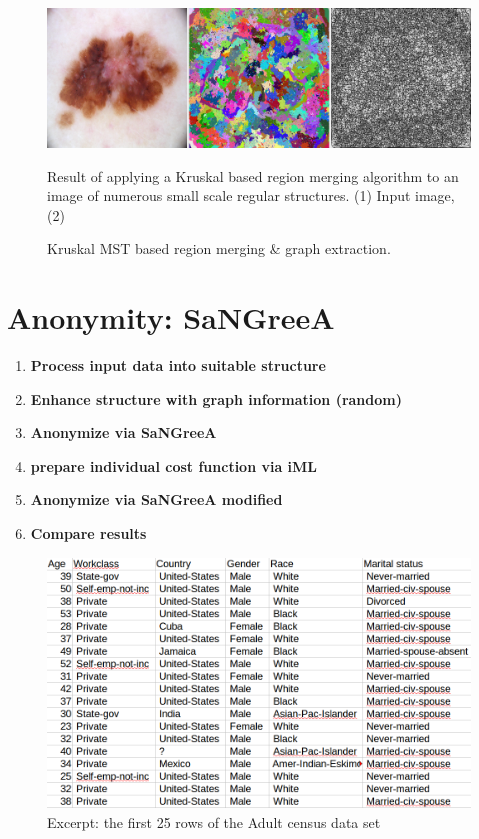 	\begin{figure}[H]
		\begin{center}
			\includegraphics [width=1\textwidth] {figures/graph_ext}
			\caption{Kruskal MST based region merging \& graph extraction.}
			\label{fig:graph_extract}
		\end{center}
		\small 
		Result of applying a Kruskal based region merging algorithm to an image of numerous small scale regular structures. (1) Input image, (2) 
		
	\end{figure}


\section{Anonymity: SaNGreeA}
\label{sect:aoa_anonymization}

	\begin{enumerate}
		\item \textbf{Process input data into suitable structure}
		\item \textbf{Enhance structure with graph information (random)}
		\item \textbf{Anonymize via SaNGreeA}
		\item \textbf{prepare individual cost function via iML}
		\item \textbf{Anonymize via SaNGreeA modified}
		\item \textbf{Compare results}
	\end{enumerate}
	
	\begin{figure}[ht]
		\begin{center}
			\includegraphics[width=1\textwidth]{figures/anonym/anon_adults_input_sample_pic}
			\caption{Excerpt: the first 25 rows of the Adult census data set}
			\label{fig:adult_input_data_sample}
		\end{center}
	\end{figure}



